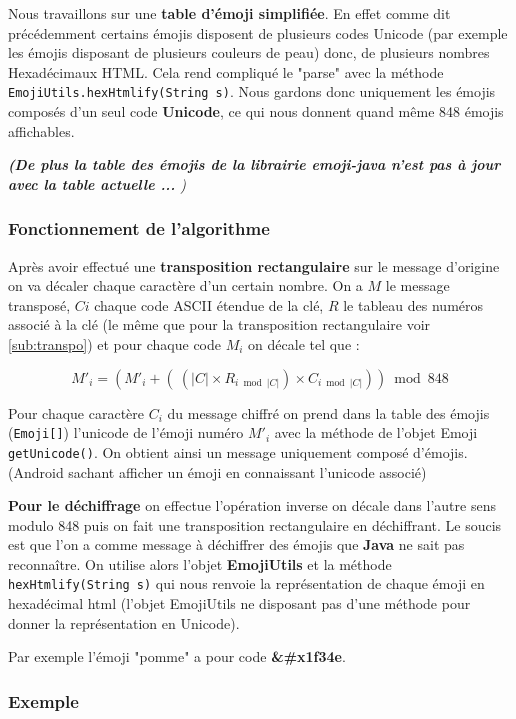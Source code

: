 \documentclass{article}
\begin{document}
Nous travaillons sur une \textbf{table d'émoji simplifiée}. En effet comme dit précédemment certains émojis disposent de plusieurs codes Unicode (par exemple les émojis disposant de plusieurs couleurs de peau) donc, de plusieurs nombres Hexadécimaux HTML. Cela rend compliqué le "parse" avec la méthode \verb+EmojiUtils.hexHtmlify(String s)+. Nous gardons donc uniquement les émojis composés d'un seul code \textbf{Unicode}, ce qui nous donnent quand même 848 émojis affichables.

\textit{\textbf{(De plus la table des émojis de la librairie  emoji-java n'est pas à jour avec la table actuelle ... })}
\subsubsection{Fonctionnement de l'algorithme}

Après avoir effectué une \textbf{transposition rectangulaire} sur le message d'origine on va décaler chaque caractère d'un certain nombre. On a $M$ le message transposé, $Ci$ chaque code ASCII étendue de la clé, $R$ le tableau des numéros associé à la clé (le même que pour la transposition rectangulaire voir \ref{sub:transpo}) et pour chaque code  $M_i$ on décale tel que :  

\[ M'_i = (M'_i + (\   (|C| \times R_{i \bmod |C|}) \times C_{i \bmod |C|})) \bmod 848 \]

Pour chaque caractère $C_i$ du message chiffré on prend dans la table des émojis (\verb+Emoji[]+) l'unicode de l'émoji numéro $M'_i$ avec la méthode de l'objet Emoji \verb+getUnicode()+. On obtient ainsi un message uniquement composé d'émojis. (Android sachant afficher un émoji en connaissant l'unicode associé)
\vspace{1\baselineskip} 

\textbf{Pour le déchiffrage} on effectue l'opération inverse on décale dans l'autre sens modulo 848 puis on fait une transposition rectangulaire en déchiffrant.
Le soucis est que l'on a comme message à déchiffrer des émojis que \textbf{Java} ne sait pas reconnaître. On utilise alors l'objet \textbf{EmojiUtils} et la méthode \verb+hexHtmlify(String s)+ qui nous renvoie la représentation de chaque émoji en hexadécimal html (l'objet EmojiUtils ne disposant pas d'une méthode pour donner la représentation en Unicode). 

Par exemple l'émoji "pomme" a pour code \textbf{\&\#x1f34e}.

\subsubsection{Exemple}
\end{document}

